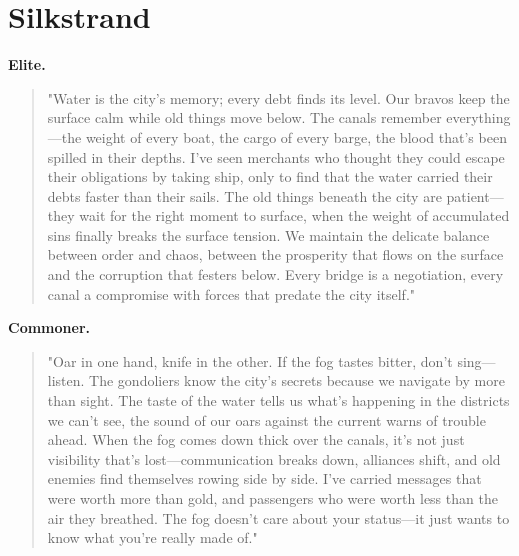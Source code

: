 \section*{Silkstrand}
\textbf{Elite.}
\begin{quote}
"Water is the city's memory; every debt finds its level. Our bravos keep the surface calm while old things move below. The canals remember everything—the weight of every boat, the cargo of every barge, the blood that's been spilled in their depths. I've seen merchants who thought they could escape their obligations by taking ship, only to find that the water carried their debts faster than their sails. The old things beneath the city are patient—they wait for the right moment to surface, when the weight of accumulated sins finally breaks the surface tension. We maintain the delicate balance between order and chaos, between the prosperity that flows on the surface and the corruption that festers below. Every bridge is a negotiation, every canal a compromise with forces that predate the city itself."
\end{quote}
\textbf{Commoner.}
\begin{quote}
"Oar in one hand, knife in the other. If the fog tastes bitter, don't sing—listen. The gondoliers know the city's secrets because we navigate by more than sight. The taste of the water tells us what's happening in the districts we can't see, the sound of our oars against the current warns of trouble ahead. When the fog comes down thick over the canals, it's not just visibility that's lost—communication breaks down, alliances shift, and old enemies find themselves rowing side by side. I've carried messages that were worth more than gold, and passengers who were worth less than the air they breathed. The fog doesn't care about your status—it just wants to know what you're really made of."
\end{quote}

